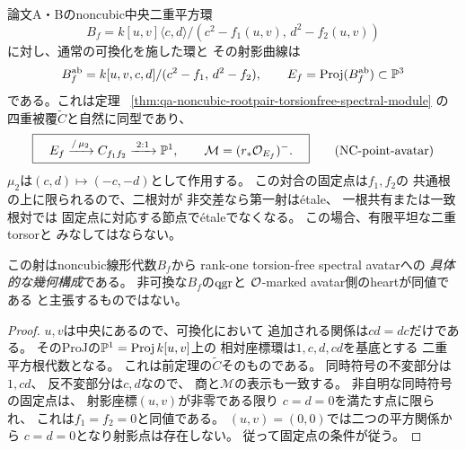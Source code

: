 \begin{corollary}[noncubic中央二重平方環の可換点曲線からの幾何射]
\label{cor:qa-noncubic-central-square-point-curve-spectral-avatar}
論文A・Bのnoncubic中央二重平方環
\[
 B_f=k[u,v]\langle c,d\rangle/
          (c^2-f_1(u,v),\,d^2-f_2(u,v))
\]
に対し、通常の可換化を施した環と
その射影曲線は
\[
 B_f^{\mathrm{ab}}=
 k[u,v,c,d]/(c^2-f_1,\,d^2-f_2),\qquad
 E_f=\operatorname{Proj}(B_f^{\mathrm{ab}})
 \subset\mathbb P^3
\]
である。これは定理
~\ref{thm:qa-noncubic-rootpair-torsionfree-spectral-module}
の四重被覆$\widetilde C$と自然に同型であり、
\[
 \boxed{\quad
 E_f\xrightarrow{/\,\mu_2}C_{f_1f_2}
 \xrightarrow{\;2:1\;}\mathbb P^1,
 \qquad
 \mathcal M=(r_*\mathcal O_{E_f})^- .
 \quad}
 \tag{NC-point-avatar}\label{eq:qa-noncubic-pointcurve-spectral-factorization}
\]
$\mu_2$は$(c,d)\mapsto(-c,-d)$として作用する。
この対合の固定点は$f_1,f_2$の
共通根の上に限られるので、二根対が
非交差なら第一射はétale、
一根共有または一致根対では
固定点に対応する節点でétaleでなくなる。
この場合、有限平坦な二重torsorと
みなしてはならない。

この射はnoncubic線形代数$B_f$から
rank-one torsion-free spectral avatarへの
\emph{具体的な幾何構成}である。
非可換な$B_f$の$\operatorname{qgr}$と
$\mathcal O$-marked avatar側のheartが同値である
と主張するものではない。
\end{corollary}
\begin{proof}
$u,v$は中央にあるので、可換化において
追加される関係は$cd=dc$だけである。
そのProJの$\mathbb P^1=\operatorname{Proj}k[u,v]$上の
相対座標環は$1,c,d,cd$を基底とする
二重平方根代数となる。
これは前定理の$\widetilde C$そのものである。
同時符号の不変部分は$1,cd$、
反不変部分は$c,d$なので、
商と$\mathcal M$の表示も一致する。
非自明な同時符号の固定点は、
射影座標$(u,v)$が非零である限り
$c=d=0$を満たす点に限られ、
これは$f_1=f_2=0$と同値である。
$(u,v)=(0,0)$では二つの平方関係から
$c=d=0$となり射影点は存在しない。
従って固定点の条件が従う。
\end{proof}

